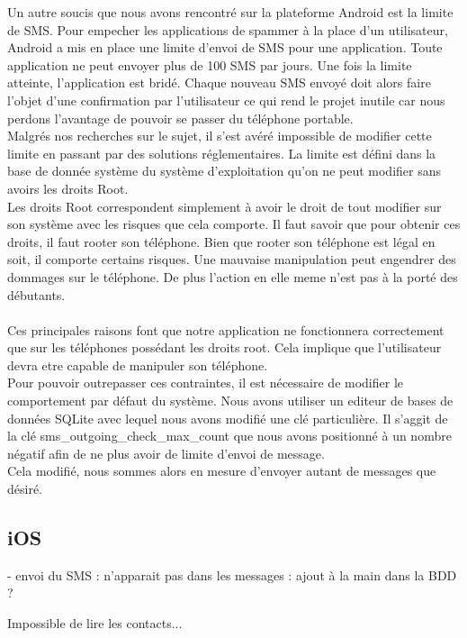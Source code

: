 Un autre soucis que nous avons rencontré sur la plateforme Android est la limite de SMS. Pour empecher
les applications de spammer à la place d'un utilisateur, Android a mis en place une limite d'envoi de 
SMS pour une application. Toute application ne peut envoyer plus de 100 SMS par jours. Une fois la limite
atteinte, l'application est bridé. Chaque nouveau SMS envoyé doit alors faire l'objet d'une confirmation
par l'utilisateur ce qui rend le projet inutile car nous perdons l'avantage de pouvoir se passer du 
téléphone portable.
\\
Malgrés nos recherches sur le sujet, il s'est avéré impossible de modifier cette limite en passant par
des solutions réglementaires. La limite est défini dans la base de donnée système du système d'exploitation
qu'on ne peut modifier sans avoirs les droits Root.
\\
Les droits Root correspondent simplement à avoir le droit de tout modifier sur son système avec les 
risques que cela comporte. Il faut savoir que pour obtenir ces droits, il faut rooter son téléphone.
Bien que rooter son téléphone est légal en soit, il comporte certains risques. Une mauvaise manipulation
peut engendrer des dommages sur le téléphone. De plus l'action en elle meme n'est pas à la porté des 
débutants.
\\\\
Ces principales raisons font que notre application ne fonctionnera correctement que sur les téléphones
possédant les droits root. Cela implique que l'utilisateur devra etre capable de manipuler son téléphone.
\\
Pour pouvoir outrepasser ces contraintes, il est nécessaire de modifier le comportement par défaut du 
système. Nous avons utiliser un editeur de bases de données SQLite avec lequel nous avons modifié une clé 
particulière. Il s'aggit de la clé sms_outgoing_check_max_count que nous avons positionné à un nombre négatif
afin de ne plus avoir de limite d'envoi de message.
\\
Cela modifié, nous sommes alors en mesure d'envoyer autant de messages que désiré. 





\subsection{iOS}

- envoi du SMS : n'apparait pas dans les messages : ajout à la main dans la BDD ?



Impossible de lire les contacts...
\\
